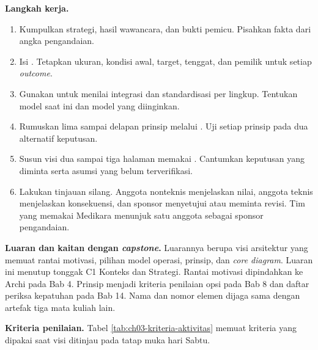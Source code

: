 \textbf{Langkah kerja.}

\begin{enumerate}
  \item Kumpulkan strategi, hasil wawancara, dan bukti pemicu. Pisahkan fakta dari angka
        pengandaian.
  \item Isi . Tetapkan ukuran,
        kondisi awal, target, tenggat, dan pemilik untuk setiap \textit{outcome}.
  \item Gunakan  untuk menilai
        integrasi dan standardisasi per lingkup. Tentukan model saat ini dan model yang
        diinginkan.
  \item Rumuskan lima sampai delapan prinsip melalui
        . Uji setiap prinsip pada dua
        alternatif keputusan.
  \item Susun visi dua sampai tiga halaman memakai
        . Cantumkan keputusan yang
        diminta serta asumsi yang belum terverifikasi.
  \item Lakukan tinjauan silang. Anggota nonteknis menjelaskan nilai, anggota teknis
        menjelaskan konsekuensi, dan sponsor menyetujui atau meminta revisi. Tim yang
        memakai Medikara menunjuk satu anggota sebagai sponsor pengandaian.
\end{enumerate}

\textbf{Luaran dan kaitan dengan \textit{capstone}.} Luarannya berupa visi arsitektur
yang memuat rantai motivasi, pilihan model operasi, prinsip, dan \textit{core diagram}.
Luaran ini menutup tonggak C1 Konteks dan Strategi. Rantai motivasi dipindahkan ke Archi
pada Bab 4. Prinsip menjadi kriteria penilaian opsi pada Bab 8 dan daftar periksa kepatuhan
pada Bab 14. Nama dan nomor elemen dijaga sama dengan artefak tiga mata kuliah lain.

\textbf{Kriteria penilaian.} Tabel \ref{tab:ch03-kriteria-aktivitas} memuat kriteria
yang dipakai saat visi ditinjau pada tatap muka hari Sabtu.

